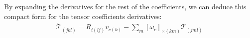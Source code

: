 By expanding the derivatives for the rest of the coefficients, we can deduce this compact form for the tensor coefficients derivatives:
\begin{equation}
\begin{gathered}
  \dot{\mathcal{T}}_{(jkl)} = R_{i(lj)}v_{c(k)} - \sum_{m} {[\omega_{c}]}_{\times(km)} \mathcal{T}_{(jml)}

\end{gathered}
\end{equation}
